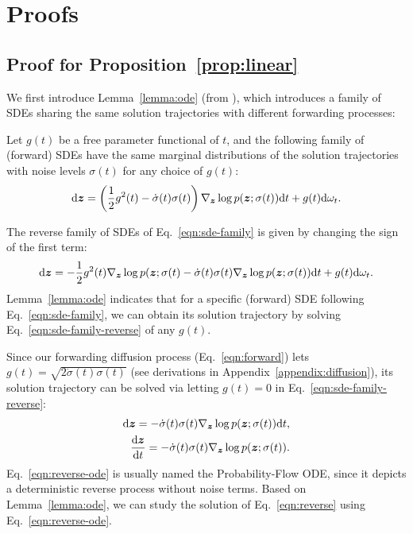 \section{Proofs}\label{appendix:proof}
\subsection{Proof for Proposition~\ref{prop:linear}}
We first introduce Lemma~\ref{lemma:ode} (from \citep{edm}), which introduces a family of SDEs sharing the same solution trajectories with different forwarding processes:
\begin{lemma}\label{lemma:ode}
    Let $g(t)$ be a free parameter functional of $t$, and the following family of (forward) SDEs have the same marginal distributions of the solution trajectories with noise levels $\sigma(t)$ for any choice of $g(t)$:
    \begin{equation}\label{eqn:sde-family}
        {\rm d} {\bm{z}} = \left(\frac{1}{2}g^2(t) - \dot{\sigma}(t)\sigma(t) \right) \nabla_{{\bm{z}}} \log p ({\bm{z}}; \sigma(t)) {\rm d} t + g(t) {\rm d} \omega_t.
    \end{equation}
\end{lemma}
The reverse family of SDEs of Eq.~\ref{eqn:sde-family} is given by changing the sign of the first term:
\begin{equation}\label{eqn:sde-family-reverse}
        {\rm d} {\bm{z}} = - \frac{1}{2}g^2(t)\nabla_{{\bm{z}}} \log p ({\bm{z}}; \sigma(t) - \dot{\sigma}(t)\sigma(t)  \nabla_{{\bm{z}}} \log p ({\bm{z}}; \sigma(t)) {\rm d} t + g(t) {\rm d} \omega_t.
\end{equation}
Lemma~\ref{lemma:ode} indicates that for a specific (forward) SDE following Eq.~\ref{eqn:sde-family}, we can obtain its solution trajectory by solving Eq.~\ref{eqn:sde-family-reverse} of any $g(t)$. 

Since our forwarding diffusion process (Eq.~\ref{eqn:forward}) lets $g(t) = \sqrt{2\dot{\sigma}(t)\sigma(t)}$ (see derivations in Appendix~\ref{appendix:diffusion}), its solution trajectory can be solved via letting $g(t) = 0$ in Eq.~\ref{eqn:sde-family-reverse}:
\begin{equation}\label{eqn:reverse-ode}
\begin{split}
       {\rm d} {\bm{z}} = - \dot{\sigma}(t)\sigma(t)  \nabla_{{\bm{z}}} \log p ({\bm{z}}; \sigma(t) ){\rm d} t, \\
        \frac{{\rm d} {\bm{z}}}{ {\rm d} t } =  - \dot{\sigma}(t)\sigma(t)  \nabla_{{\bm{z}}} \log p ({\bm{z}}; \sigma(t)). \\ 
\end{split}
\end{equation}
Eq.~\ref{eqn:reverse-ode} is usually named the Probability-Flow ODE, since it depicts a deterministic reverse process without noise terms. Based on Lemma~\ref{lemma:ode}, we can study the solution of Eq.~\ref{eqn:reverse} using Eq.~\ref{eqn:reverse-ode}.

